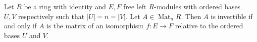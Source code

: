 Let $R$ be a ring with identity and $E,F$ free left $R$-modules with ordered bases $U,V$ respectively such that $|U| = n = |V|$. Let $A \in \operatorname{Mat}_n R$. Then $A$ is invertible if and only if $A$ is the matrix of an isomorphism $f : E \to F$ relative to the ordered bases $U$ and $V$.
